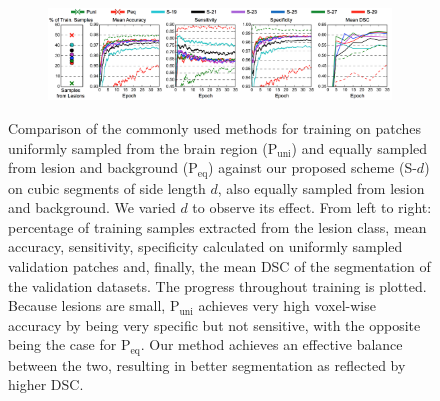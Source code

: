 \begin{figure}[!h]
\centering
\begin{subfigure}[b]{1.0\textwidth}
\centering
	\includegraphics[clip=true, trim=0pt 0pt 0pt 0pt, width=1.0\textwidth]{figures/validationOfArchitecture/denseTraining/denseFigureToPlace.png}
\end{subfigure}
\caption{Comparison of the commonly used methods for training on patches uniformly sampled from the brain region (P$_\text{uni}$) and equally sampled from lesion and background (P$_\text{eq}$) against our proposed scheme (S-${d}$) on cubic segments of side length $d$, also equally sampled from lesion and background. We varied $d$ to observe its effect. From left to right: percentage of training samples extracted from the lesion class, mean accuracy, sensitivity, specificity calculated on uniformly sampled validation patches and, finally, the mean DSC of the segmentation of the validation datasets. The progress throughout training is plotted. Because lesions are small, P$_\text{uni}$ achieves very high voxel-wise accuracy by being very specific but not sensitive, with the opposite being the case for P$_\text{eq}$. Our method achieves an effective balance between the two, resulting in better segmentation as reflected by higher DSC.}
\label{fig:denseTrainingExperiment}
\end{figure}
